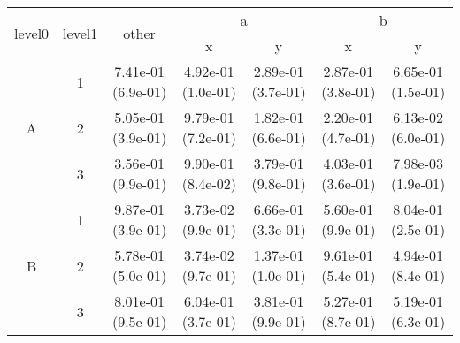 \begin{tabular}{ccccccc}
\toprule
\multirow{2}{*}{level0} & \multirow{2}{*}{level1}& \multirow{2}{*}{other}&\multicolumn{2}{c}{a}&\multicolumn{2}{c}{b}\tabularnewline
\cmidrule(lr){4-5}
\cmidrule(lr){6-7}
&&&x&y&x&y\tabularnewline
\midrule
\multirow{3}{*}{A}&1& 7.41e-01 (6.9e-01)& 4.92e-01 (1.0e-01)& 2.89e-01 (3.7e-01)& 2.87e-01 (3.8e-01)& 6.65e-01 (1.5e-01)\tabularnewline
&2& 5.05e-01 (3.9e-01)& 9.79e-01 (7.2e-01)& 1.82e-01 (6.6e-01)& 2.20e-01 (4.7e-01)& 6.13e-02 (6.0e-01)\tabularnewline
&3& 3.56e-01 (9.9e-01)& 9.90e-01 (8.4e-02)& 3.79e-01 (9.8e-01)& 4.03e-01 (3.6e-01)& 7.98e-03 (1.9e-01)\tabularnewline
\midrule
\multirow{3}{*}{B}&1& 9.87e-01 (3.9e-01)& 3.73e-02 (9.9e-01)& 6.66e-01 (3.3e-01)& 5.60e-01 (9.9e-01)& 8.04e-01 (2.5e-01)\tabularnewline
&2& 5.78e-01 (5.0e-01)& 3.74e-02 (9.7e-01)& 1.37e-01 (1.0e-01)& 9.61e-01 (5.4e-01)& 4.94e-01 (8.4e-01)\tabularnewline
&3& 8.01e-01 (9.5e-01)& 6.04e-01 (3.7e-01)& 3.81e-01 (9.9e-01)& 5.27e-01 (8.7e-01)& 5.19e-01 (6.3e-01)\tabularnewline
\bottomrule
\end{tabular}
